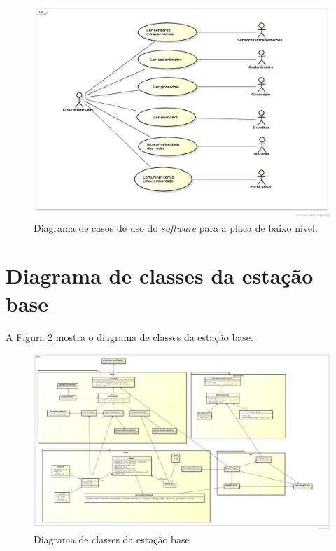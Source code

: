 \begin{figure}[H]
  \centering
  \includegraphics[width=\textwidth, keepaspectratio]{./figuras/diagrama_caso_uso_placa_embarcada.png}
  \caption{Diagrama de casos de uso do \textit{software} para a placa de baixo nível.}
  \label{fig:diagrama_caso_uso_placa_embarcada}
\end{figure}

\section{Diagrama de classes da estação base}

A Figura \ref{fig:diagrama_classes_estacao_base} mostra o diagrama de classes da estação base.
\begin{figure}[H]
  \centering
  \includegraphics[width=\textwidth]{./figuras/diagrama_classes_estacao_base.png}
  \caption{Diagrama de classes da estação base}
  \label{fig:diagrama_classes_estacao_base}
\end{figure}

